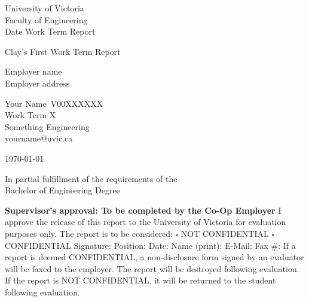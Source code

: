 \documentclass[11pt]{article}
\providecommand{\blankline}{\underline{\hspace{3cm}}}
\newenvironment{ApprovalBox}
	{ %
		\begin{framed}			
		\begin{scriptsize}
		\begin{flushleft}
		\begin{small}
	}
	{ %
		\end{small}
		\end{flushleft}
		\end{scriptsize}
		\end{framed}
	}
\begin{document}
\begin{center}
University of Victoria\\
Faculty of Engineering\\
Date Work Term Report\\
\vspace{1cm}

{\huge Clay's First Work Term Report}\\
\vspace{1cm}

Employer name \\
Employer address\\
\vspace{1cm}

Your Name\
V00XXXXXX\\
Work Term X\\
Something Engineering\\
yourname@uvic.ca\\
\vspace{0.5cm}

\today \\
\vspace{1cm}

In partial fulfillment of the requirements of the\\
Bachelor of Engineering Degree\\
\vspace{4cm}



\begin{ApprovalBox}
	\textbf{Supervisor's approval: To be completed by the Co-Op Employer} 
	\newline\newline
	I approve the release of this report to the University of Victoria for evaluation purposes only. 
	\newline\newline
	The report is to be considered: \quad $\square${} NOT CONFIDENTIAL \quad $\square${} CONFIDENTIAL
	\newline\newline
	Signature: \blankline{} Position: \blankline{} Date: \blankline{} \newline\newline
	Name (print): \blankline{} E-Mail: \blankline{} Fax \#: \blankline{} 
	\newline\newline
	If a report is deemed CONFIDENTIAL, a non-disclosure form signed by an evaluator will be faxed to the employer. The report will be destroyed following evaluation. If the report is NOT CONFIDENTIAL, it will be returned to the student following evaluation.
\end{ApprovalBox}

\end{center}
\restoregeometry		%
\end{document}
